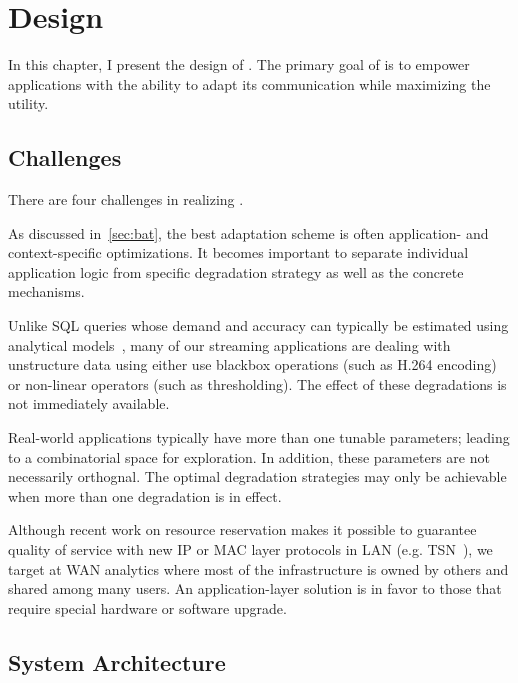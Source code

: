 \chapter{\sysname{} Design}
\label{sec:system-design}

In this chapter, I present the design of \sysname{}. The primary goal of
\sysname{} is to empower applications with the ability to adapt its
communication while maximizing the utility.

\section{Challenges}
\label{sec:challenges}

\noindent There are four challenges in realizing \sysname{}.

 As discussed in~\autoref{sec:bat}, the
best adaptation scheme is often application- and context-specific
optimizations. It becomes important to separate individual application logic
from specific degradation strategy as well as the concrete mechanisms.

 Unlike SQL queries whose demand and accuracy
can typically be estimated using analytical models~\cite{cormode2012synopses},
many of our streaming applications are dealing with unstructure data using
either use blackbox operations (such as H.264 encoding) or non-linear operators
(such as thresholding). The effect of these degradations is not immediately
available.

 Real-world applications typically have
more than one tunable parameters; leading to a combinatorial space for
exploration. In addition, these parameters are not necessarily orthognal.  The
optimal degradation strategies may only be achievable when more than one
degradation is in effect.

 Although recent work on
resource reservation makes it possible to guarantee quality of service with new
IP or MAC layer protocols in LAN (e.g. TSN~\cite{johas2013heterogeneous}), we
target at WAN analytics where most of the infrastructure is owned by others and
shared among many users. An application-layer solution is in favor to those that
require special hardware or software upgrade.

\section{System Architecture}
\label{sec:architecture}

